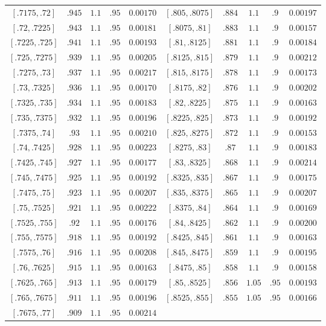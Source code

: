\begin{center}
\begin{longtable}{@{}ccccc@{\qquad}ccccc@{}}
$[.7175,.72]$ & $.945$ & $1.1$ & $.95$ & $0.00170$ & $[.805,.8075]$ & $.884$ & $1.1$ & $.9$ & $0.00197$ \\
$[.72,.7225]$ & $.943$ & $1.1$ & $.95$ & $0.00181$ & $[.8075,.81]$ & $.883$ & $1.1$ & $.9$ & $0.00157$ \\
$[.7225,.725]$ & $.941$ & $1.1$ & $.95$ & $0.00193$ & $[.81,.8125]$ & $.881$ & $1.1$ & $.9$ & $0.00184$ \\
$[.725,.7275]$ & $.939$ & $1.1$ & $.95$ & $0.00205$ & $[.8125,.815]$ & $.879$ & $1.1$ & $.9$ & $0.00212$ \\
$[.7275,.73]$ & $.937$ & $1.1$ & $.95$ & $0.00217$ & $[.815,.8175]$ & $.878$ & $1.1$ & $.9$ & $0.00173$ \\
$[.73,.7325]$ & $.936$ & $1.1$ & $.95$ & $0.00170$ & $[.8175,.82]$ & $.876$ & $1.1$ & $.9$ & $0.00202$ \\
$[.7325,.735]$ & $.934$ & $1.1$ & $.95$ & $0.00183$ & $[.82,.8225]$ & $.875$ & $1.1$ & $.9$ & $0.00163$ \\
$[.735,.7375]$ & $.932$ & $1.1$ & $.95$ & $0.00196$ & $[.8225,.825]$ & $.873$ & $1.1$ & $.9$ & $0.00192$ \\
$[.7375,.74]$ & $.93$ & $1.1$ & $.95$ & $0.00210$ & $[.825,.8275]$ & $.872$ & $1.1$ & $.9$ & $0.00153$ \\
$[.74,.7425]$ & $.928$ & $1.1$ & $.95$ & $0.00223$ & $[.8275,.83]$ & $.87$ & $1.1$ & $.9$ & $0.00183$ \\
$[.7425,.745]$ & $.927$ & $1.1$ & $.95$ & $0.00177$ & $[.83,.8325]$ & $.868$ & $1.1$ & $.9$ & $0.00214$ \\
$[.745,.7475]$ & $.925$ & $1.1$ & $.95$ & $0.00192$ & $[.8325,.835]$ & $.867$ & $1.1$ & $.9$ & $0.00175$ \\
$[.7475,.75]$ & $.923$ & $1.1$ & $.95$ & $0.00207$ & $[.835,.8375]$ & $.865$ & $1.1$ & $.9$ & $0.00207$ \\
$[.75,.7525]$ & $.921$ & $1.1$ & $.95$ & $0.00222$ & $[.8375,.84]$ & $.864$ & $1.1$ & $.9$ & $0.00169$ \\
$[.7525,.755]$ & $.92$ & $1.1$ & $.95$ & $0.00176$ & $[.84,.8425]$ & $.862$ & $1.1$ & $.9$ & $0.00200$ \\
$[.755,.7575]$ & $.918$ & $1.1$ & $.95$ & $0.00192$ & $[.8425,.845]$ & $.861$ & $1.1$ & $.9$ & $0.00163$ \\
$[.7575,.76]$ & $.916$ & $1.1$ & $.95$ & $0.00208$ & $[.845,.8475]$ & $.859$ & $1.1$ & $.9$ & $0.00195$ \\
$[.76,.7625]$ & $.915$ & $1.1$ & $.95$ & $0.00163$ & $[.8475,.85]$ & $.858$ & $1.1$ & $.9$ & $0.00158$ \\
$[.7625,.765]$ & $.913$ & $1.1$ & $.95$ & $0.00179$ & $[.85,.8525]$ & $.856$ & $1.05$ & $.95$ & $0.00193$ \\
$[.765,.7675]$ & $.911$ & $1.1$ & $.95$ & $0.00196$ & $[.8525,.855]$ & $.855$ & $1.05$ & $.95$ & $0.00166$ \\
$[.7675,.77]$ & $.909$ & $1.1$ & $.95$ & $0.00214$ & & & & & \\
\end{longtable}
\end{center}

